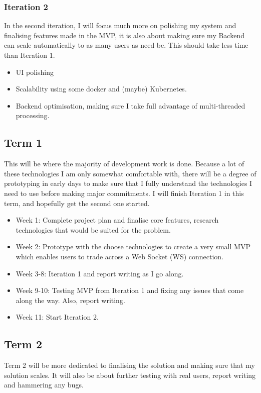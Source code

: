 \documentclass[titlepage]{article}
\begin{document}
\subsubsection{Iteration 2}
In the second iteration, I will focus much more on polishing my system and finalising features made in the MVP, it is also about making sure my Backend can scale automatically to as many users as need be. This should take less time than Iteration 1.
\begin{itemize}
	\item UI polishing
	\item Scalability using some docker and (maybe) Kubernetes.
	\item Backend optimisation, making sure I take full advantage of multi-threaded processing.
\end{itemize}

\subsection{Term 1}
This will be where the majority of development work is done. Because a lot of these technologies I am only somewhat comfortable with, there will be a degree of prototyping in early days to make sure that I fully understand the technologies I need to use before making major commitments. I will finish Iteration 1 in this term, and hopefully get the second one started.


\begin{itemize}
	\item Week 1: Complete project plan and finalise core features, research technologies that would be suited for the problem.
	\item Week 2: Prototype with the choose technologies to create a very small MVP which enables users to trade across a Web Socket (WS) connection.
	\item Week 3-8: Iteration 1 and report writing as I go along.
	\item Week 9-10: Testing MVP from Iteration 1 and fixing any issues that come along the way. Also, report writing.
	\item Week 11: Start Iteration 2.
\end{itemize}

\subsection{Term 2}
Term 2 will be more dedicated to finalising the solution and making sure that my solution scales. It will also be about further testing with real users, report writing and hammering any bugs.
\end{document}
